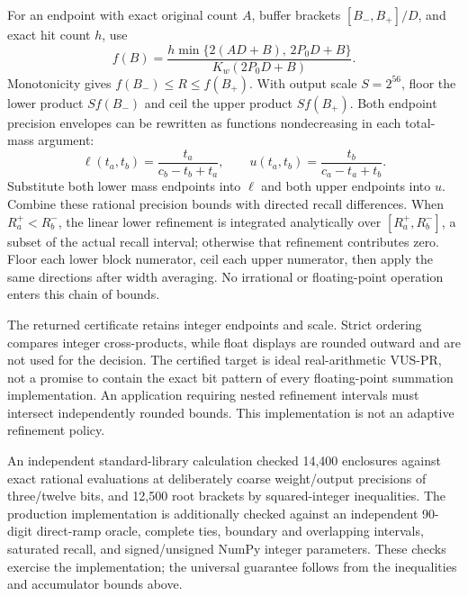 For an endpoint with exact original count $A$, buffer brackets
$[B_-,B_+]/D$, and exact hit count $h$, use
\[
 f(B)=\frac{h\min\{2(AD+B),\,2P_0D+B\}}
              {K_w(2P_0D+B)}.
\]
Monotonicity gives $f(B_-)\leq R\leq f(B_+)$. With output scale
$S=2^{56}$, floor the lower product $Sf(B_-)$ and ceil the upper
product $Sf(B_+)$. Both endpoint precision envelopes can be rewritten
as functions nondecreasing in each total-mass argument:
\[
 \ell(t_a,t_b)=\frac{t_a}{c_b-t_b+t_a},\qquad
 u(t_a,t_b)=\frac{t_b}{c_a-t_a+t_b}.
\]
Substitute both lower mass endpoints into $\ell$ and both upper
endpoints into $u$. Combine these rational precision bounds with directed
recall differences. When $R_a^+<R_b^-$, the linear lower refinement is
integrated analytically over $[R_a^+,R_b^-]$, a subset of the actual recall
interval; otherwise that refinement contributes zero. Floor each
lower block numerator, ceil each upper numerator, then apply the same
directions after width averaging. No irrational or floating-point
operation enters this chain of bounds.

The returned certificate retains integer endpoints and scale. Strict
ordering compares integer cross-products, while float displays are
rounded outward and are not used for the decision. The certified target
is ideal real-arithmetic VUS-PR, not a promise to contain the exact bit
pattern of every floating-point summation implementation. An application
requiring nested refinement intervals must intersect independently rounded
bounds. This implementation is not an adaptive refinement policy.

An independent standard-library calculation checked 14,400 enclosures
against exact rational evaluations at deliberately coarse weight/output
precisions of three/twelve bits, and 12,500 root brackets by squared-integer
inequalities. The production implementation is additionally checked against
an independent 90-digit direct-ramp oracle, complete ties, boundary and
overlapping intervals, saturated recall, and signed/unsigned NumPy integer
parameters. These checks exercise the implementation; the universal
guarantee follows from the inequalities and accumulator bounds above.
